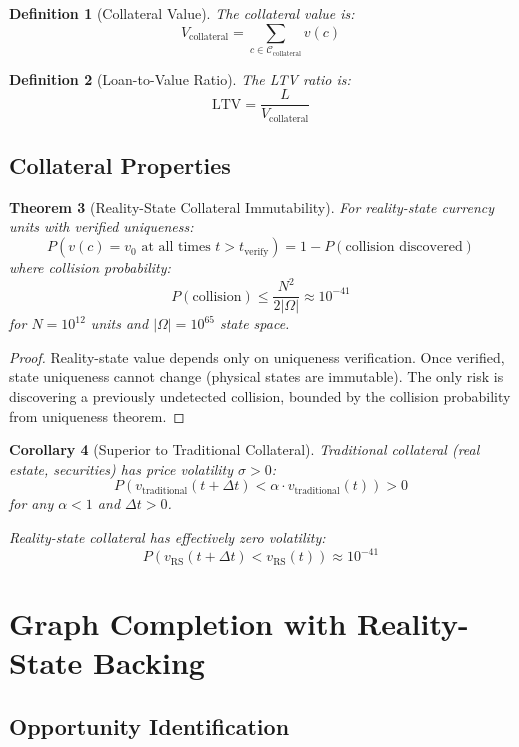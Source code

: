 \documentclass[12pt]{article}
\newtheorem{theorem}{Theorem}
\newtheorem{definition}[theorem]{Definition}
\newtheorem{corollary}[theorem]{Corollary}
\begin{document}
\begin{definition}[Collateral Value]
The collateral value is:
$$
V_{\text{collateral}} = \sum_{c \in \mathcal{C}_{\text{collateral}}} v(c)
$$
\end{definition}

\begin{definition}[Loan-to-Value Ratio]
The LTV ratio is:
$$
\text{LTV} = \frac{L}{V_{\text{collateral}}}
$$
\end{definition}

\subsection{Collateral Properties}

\begin{theorem}[Reality-State Collateral Immutability]
For reality-state currency units with verified uniqueness:
$$
P(v(c) = v_0 \text{ at all times } t > t_{\text{verify}}) = 1 - P(\text{collision discovered})
$$
where collision probability:
$$
P(\text{collision}) \leq \frac{N^2}{2|\Omega|} \approx 10^{-41}
$$
for $N = 10^{12}$ units and $|\Omega| = 10^{65}$ state space.
\end{theorem}

\begin{proof}
Reality-state value depends only on uniqueness verification. Once verified, state uniqueness cannot change (physical states are immutable). The only risk is discovering a previously undetected collision, bounded by the collision probability from uniqueness theorem.
\end{proof}

\begin{corollary}[Superior to Traditional Collateral]
Traditional collateral (real estate, securities) has price volatility $\sigma > 0$:
$$
P(v_{\text{traditional}}(t+\Delta t) < \alpha \cdot v_{\text{traditional}}(t)) > 0
$$
for any $\alpha < 1$ and $\Delta t > 0$.

Reality-state collateral has effectively zero volatility:
$$
P(v_{\text{RS}}(t+\Delta t) < v_{\text{RS}}(t)) \approx 10^{-41}
$$
\end{corollary}

\section{Graph Completion with Reality-State Backing}

\subsection{Opportunity Identification}
\end{document}
